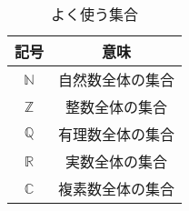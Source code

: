 \begin{comment}
 \begin{table}[htbp]
   \centering
   \captionsetup{labelformat=empty,labelsep=none} %
   \caption{筆記体一覧}
   \scalebox{0.95}{
   \begin{tabular}{cc|cc}
     \hline
     大文字 & 対応する大文字 & 大文字 & 対応する大文字 \\ \hline
     $\mathcal{A}$ & $A$ & $\mathcal{N}$ & $N$ \\
     $\mathcal{B}$ & $B$ & $\mathcal{O}$ & $O$ \\
     $\mathcal{C}$ & $C$ & $\mathcal{P}$ & $P$ \\
     $\mathcal{D}$ & $D$ & $\mathcal{Q}$ & $Q$ \\
     $\mathcal{E}$ & $E$ & $\mathcal{R}$ & $R$ \\
     $\mathcal{F}$ & $F$ & $\mathcal{S}$ & $S$ \\
     $\mathcal{G}$ & $G$ & $\mathcal{T}$ & $T$ \\
     $\mathcal{H}$ & $H$ & $\mathcal{U}$ & $U$ \\
     $\mathcal{I}$ & $I$ & $\mathcal{V}$ & $V$ \\
     $\mathcal{J}$ & $J$ & $\mathcal{W}$ & $W$ \\
     $\mathcal{K}$ & $K$ & $\mathcal{X}$ & $X$ \\
     $\mathcal{L}$ & $L$ & $\mathcal{Y}$ & $Y$ \\
     $\mathcal{M}$ & $M$ & $\mathcal{Z}$ & $Z$ \\ \hline
   \end{tabular}
 }
 \end{table}
\end{comment}
 \begin{table}[p]
   \centering
   \captionsetup{labelformat=empty,labelsep=none} %
   \caption{よく使う集合}
   \begin{tabular}{cc}
     \hline
     記号 & 意味 \\ \hline
     $\mathbb{N}$ & 自然数全体の集合 \\
     $\mathbb{Z}$ & 整数全体の集合 \\
     $\mathbb{Q}$ & 有理数全体の集合 \\
     $\mathbb{R}$ & 実数全体の集合 \\
     $\mathbb{C}$ & 複素数全体の集合 \\ \hline
   \end{tabular}
 \end{table}






